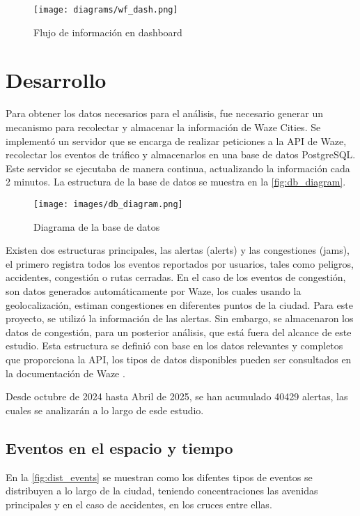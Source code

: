 \documentclass[12pt]{article}
\begin{document}
\begin{figure}[h]
    \centering
    \texttt{[image: diagrams/wf\_dash.png]}
    \caption{Flujo de información en dashboard}
    \label{fig:wf_dash}
\end{figure}

\section{Desarrollo}

Para obtener los datos necesarios para el análisis, fue necesario generar un mecanismo para recolectar y almacenar la información de Waze Cities. Se implementó un servidor que se encarga de realizar peticiones a la API de Waze, recolectar los eventos de tráfico y almacenarlos en una base de datos PostgreSQL. Este servidor se ejecutaba de manera continua, actualizando la información cada 2 minutos. La estructura de la base de datos se muestra en la \autoref{fig:db_diagram}.

\begin{figure}[H]
    \centering
    \texttt{[image: images/db\_diagram.png]}
    \caption{Diagrama de la base de datos}
    \label{fig:db_diagram}
\end{figure}

Existen dos estructuras principales, las alertas (alerts) y las congestiones (jams), el primero registra todos los eventos reportados por usuarios, tales como peligros, accidentes, congestión o rutas cerradas. En el caso de los eventos de congestión, son datos generados automáticamente por Waze, los cuales usando la geolocalización, estiman congestiones en diferentes puntos de la ciudad. Para este proyecto, se utilizó la información de las alertas. Sin embargo, se almacenaron los datos de congestión, para un posterior análisis, que está fuera del alcance de este estudio. Esta estructura se definió con base en los datos relevantes y completos que proporciona la API, los tipos de datos disponibles pueden ser consultados en la documentación de Waze \parencite{waze2024}.

Desde octubre de 2024 hasta Abril de 2025, se han acumulado 40429 alertas, las cuales se analizarán a lo largo de esde estudio.


\subsection{Eventos en el espacio y tiempo}

En la \autoref{fig:dist_events} se muestran como los difentes tipos de eventos se distribuyen a lo largo de la ciudad, teniendo concentraciones las avenidas principales y en el caso de accidentes, en los cruces entre ellas.
\end{document}
